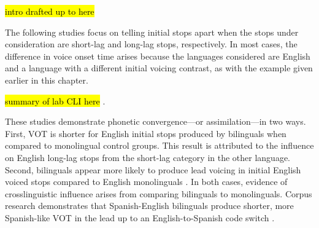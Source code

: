 


\hl{intro drafted up to here}


The following studies focus on telling initial stops apart when the stops under consideration are short-lag and long-lag stops, respectively. In most cases, the difference in voice onset time arises because the languages considered are English and a language with a different initial voicing contrast, as with the example given earlier in this chapter. 

\hl{summary of lab CLI here} \citep{fricke_2016_phonetic, antoniou_2010_context, goldrick_2014_switching, sundara_2006_production}. %

These studies demonstrate phonetic convergence---or assimilation---in two ways. First, VOT is shorter for English initial stops produced by bilinguals when compared to monolingual control groups. This result is attributed to the influence on English long-lag stops from the short-lag category in the other language. Second, bilinguals appear more likely to produce lead voicing in initial English voiced stops compared to English monolinguals \citep{sundara_2006_production}. In both cases, evidence of crosslinguistic influence arises from comparing bilinguals to monolinguals. Corpus research demonstrates that Spanish-English bilinguals produce shorter, more Spanish-like VOT in the lead up to an English-to-Spanish code switch \citep{fricke_2016_phonetic, bullock_2009_sociophonetics}. 

